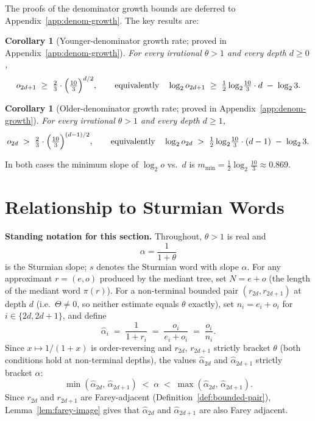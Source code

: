 \documentclass[12pt]{article}
\newtheorem{corollary}[theorem]{Corollary}
\theoremstyle{definition}
\theoremstyle{remark}
\theoremstyle{plain}
\newcommand{\Kval}{\Theta}
\begin{document}
The proofs of the denominator growth bounds are deferred to
Appendix~\ref{app:denom-growth}.  The key results are:

\begin{corollary}[Younger-denominator growth rate; proved in Appendix~\ref{app:denom-growth}]
\label{cor:denominator-growth-rate}
For every irrational $\theta > 1$ and every depth $d \geq 0$,
\[
  o_{2d+1} \;\geq\; \tfrac{2}{3}\cdot\Bigl(\tfrac{10}{3}\Bigr)^{d/2},
  \qquad\text{equivalently}\quad
  \log_2 o_{2d+1} \;\geq\; \tfrac{1}{2}\log_2\!\tfrac{10}{3}\cdot d \;-\; \log_2 3.
\]
\end{corollary}

\begin{corollary}[Older-denominator growth rate; proved in Appendix~\ref{app:denom-growth}]
\label{cor:older-denominator-growth-rate}
For every irrational $\theta > 1$ and every depth $d \geq 1$,
\[
  o_{2d} \;>\; \tfrac{2}{3}\cdot\Bigl(\tfrac{10}{3}\Bigr)^{(d-1)/2},
  \qquad\text{equivalently}\quad
  \log_2 o_{2d} \;>\; \tfrac{1}{2}\log_2\!\tfrac{10}{3}\cdot(d-1) \;-\; \log_2 3.
\]
\end{corollary}

In both cases the minimum slope of $\log_2 o$ vs.\ $d$ is
$m_{\min} = \tfrac{1}{2}\log_2\tfrac{10}{3} \approx 0.869$.

\section{Relationship to Sturmian Words}
\label{sec:sturmian}

\textbf{Standing notation for this section.}
Throughout, $\theta > 1$ is real and
\[
  \alpha = \frac{1}{1+\theta}
\]
is the Sturmian slope; $s$ denotes the Sturmian word with slope $\alpha$.
For any approximant $r = (e, o)$ produced by the mediant tree, set $N = e + o$
(the length of the mediant word $\pi(r)$).
For a non-terminal bounded pair $(r_{2d}, r_{2d+1})$ at depth $d$
(i.e.\ $\Kval \neq 0$, so neither estimate equals $\theta$ exactly),
set $n_i = e_i + o_i$ for $i \in \{2d, 2d+1\}$, and define
\[
  \hat{\alpha}_i \;=\; \frac{1}{1+r_i} \;=\; \frac{o_i}{e_i+o_i} \;=\; \frac{o_i}{n_i}.
\]
Since $x \mapsto 1/(1+x)$ is order-reversing and $r_{2d}$, $r_{2d+1}$ strictly bracket $\theta$
(both conditions hold at non-terminal depths),
the values $\hat{\alpha}_{2d}$ and $\hat{\alpha}_{2d+1}$ strictly bracket $\alpha$:
\[
  \min(\hat{\alpha}_{2d},\, \hat{\alpha}_{2d+1}) \;<\; \alpha \;<\; \max(\hat{\alpha}_{2d},\, \hat{\alpha}_{2d+1}).
\]
Since $r_{2d}$ and $r_{2d+1}$ are Farey-adjacent (Definition~\ref{def:bounded-pair}),
Lemma~\ref{lem:farey-image} gives that $\hat{\alpha}_{2d}$ and $\hat{\alpha}_{2d+1}$
are also Farey adjacent.
\end{document}
